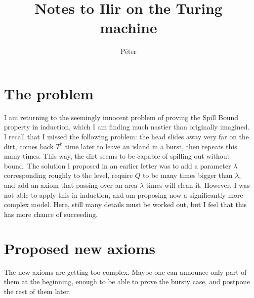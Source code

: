 \documentclass[12pt]{memoir}
\newcommand{\Tu}{T}
\begin{document}
\title{Notes to Ilir on the Turing machine}

\author{P\'eter}

\maketitle

\section{The problem}

I am returning to the seemingly innocent problem of proving the Spill Bound property
in induction, which I am finding much nastier than originally imagined.
I recall that I missed the following problem: 
the head slides away very far on the dirt, 
comes back \( \Tu^{*} \) time later to leave an island in a burst, 
then repeats this many times.
This way, the dirt seems to be capable of spilling out without bound.
The solution I proposed in an earlier letter was to add a parameter \( \lambda \)
corresponding roughly to the level, require \( Q \) to be many times bigger than \( \lambda \),
and add an axiom that passing over an area \( \lambda \) times will clean it.
However, I was not able to apply this in induction, and am proposing now a significantly
more complex model.
Here, still many details must be worked out, but I feel that this has more chance of succeeding.

\section{Proposed new axioms}

The new axioms are getting too complex.
Maybe one can announce only part of them at the beginning, enough to be
able to prove the bursty case, and postpone the rest of them later.
\end{document}

